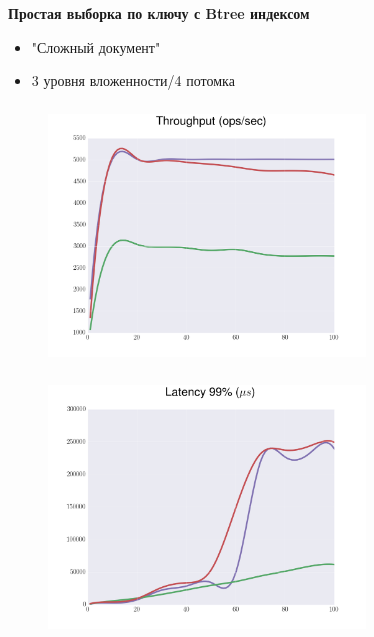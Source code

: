 \documentclass[usenames,dvipsnames, 18pt, compress, aspectratio=169]{beamer}
\begin{document}
\begin{frame}
    \frametitle{}
    \begin{center}
        \textbf{Простая выборка по ключу с Btree индексом}
        \begin{itemize}[label={}]
            \item "Сложный документ"
            \item 3 уровня вложенности/4 потомка
        \end{itemize}
    \end{center}
\end{frame}

\begin{frame}
    \frametitle{}
    \begin{center}
    \begin{figure}
        \includegraphics[width=0.75\textwidth,center]{benchmarks/workload_c_complex_object/throughput.png}
    \end{figure}
    \end{center}
\end{frame}

\begin{frame}
    \frametitle{}
    \begin{center}
    \begin{figure}
        \includegraphics[width=0.75\textwidth,center]{benchmarks/workload_c_complex_object/latency_99.png}
    \end{figure}
    \end{center}
\end{frame}
\end{document}
